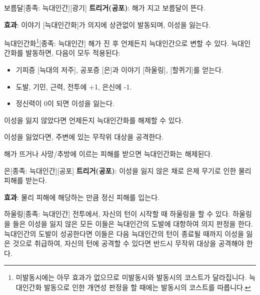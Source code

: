 \documentclass{report}
\begin{document}
	\begin{story}{보름달}{[종족: 늑대인간][광기]}
		\textbf{트리거(공포)}: 해가 지고 보름달이 뜬다.
		
		\textbf{효과}: 이야기 [늑대인간화]가 의지에 상관없이 발동되며, 이성을 잃는다.
		
		\smallskip
		
	\end{story}
	
	\begin{story}{늑대인간화\footnote{미발동시에는 아무 효과가 없으므로 미발동시와 발동시의 코스트가 달라집니다. 늑대인간화 발동으로 인한 개연성 판정을 할 때에는 발동시의 코스트를 따릅니다.}}{[종족: 늑대인간]}
		해가 진 후 언제든지 늑대인간으로 변할 수 있다. 늑대인간화를 발동하면, 다음이 모두 적용된다:
		\begin{itemize}
			\item 기피증 [늑대의 저주], 공포증 [은]과 이야기 [하울링], [할퀴기]를 얻는다.
			\item 도발, 기민, 근력, 전투에 +1, 은신에 -1.
			\item 정신력이 0이 되면 이성을 잃는다.
		\end{itemize}
		
		이성을 잃지 않았다면 언제든지 늑대인간화를 해제할 수 있다.
		
		이성을 잃었다면, 주변에 있는 무작위 대상을 공격한다.
		
		\smallskip
		
		해가 뜨거나 사망/추방에 이르는 피해를 받으면 늑대인간화는 해제된다.
		
		\smallskip
		
	\end{story}
	
	\begin{story}{은}{[종족: 늑대인간][공포]}
		\textbf{트리거(공포)}: 이성을 잃지 않은 채로 은제 무기로 인한 물리 피해를 받는다.
		
		\textbf{효과}: 물리 피해에 해당하는 만큼 정신 피해를 입는다.
		
		\smallskip
		
	\end{story}
	
	\begin{story}{하울링}{[종족: 늑대인간]}
		전투에서, 자신의 턴이 시작할 때 하울링을 할 수 있다. 하울링을 들은 이성을 잃지 않은 모든 이들은 늑대인간의 도발에 대항하여 의지 판정을 한다. 늑대인간의 도발이 성공한다면 이들은 다음 늑대인간의 턴이 종료될 때까지 이성을 잃은 것으로 취급하여, 자신의 턴에 공격할 수 있다면 반드시 무작위 대상을 공격해야 한다.
		
		\smallskip
		
	\end{story}
	
\end{document}
